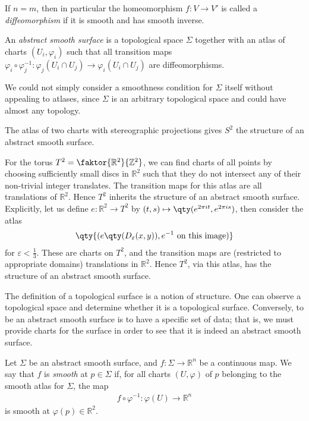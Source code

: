 If $n = m$, then in particular the homeomorphism $f \colon V \to V'$ is called a \textit{diffeomorphism} if it is smooth and has smooth inverse.
\begin{definition}
	An \textit{abstract smooth surface} is a topological space $\Sigma$ together with an atlas of charts $(U_i, \varphi_i)$ such that all transition maps $\varphi_i \circ \varphi_j^{-1} \colon \varphi_j(U_i \cap U_j) \to \varphi_i(U_i \cap U_j)$ are diffeomorphisms.
\end{definition}
\begin{remark}
	We could not simply consider a smoothness condition for $\Sigma$ itself without appealing to atlases, since $\Sigma$ is an arbitrary topological space and could have almost any topology.
\end{remark}
\begin{example}
	The atlas of two charts with stereographic projections gives $S^2$ the structure of an abstract smooth surface.
\end{example}
\begin{example}
	For the torus $T^2 = \faktor{\mathbb R^2}{\mathbb Z^2}$, we can find charts of all points by choosing sufficiently small discs in $\mathbb R^2$ such that they do not intersect any of their non-trivial integer translates.
	The transition maps for this atlas are all translations of $\mathbb R^2$.
	Hence $T^2$ inherits the structure of an abstract smooth surface.
	Explicitly, let us define $e \colon \mathbb R^2 \to T^2$ by $(t,s) \mapsto \qty(e^{2\pi i t}, e^{2 \pi i s})$, then consider the atlas
	\begin{align*}
		\qty{(e\qty(D_\varepsilon(x,y)), e^{-1} \text{ on this image})}
	\end{align*}
	for $\varepsilon < \frac{1}{3}$.
	These are charts on $T^2$, and the transition maps are (restricted to appropriate domains) translations in $\mathbb R^2$.
	Hence $T^2$, via this atlas, has the structure of an abstract smooth surface.
\end{example}
\begin{remark}
	The definition of a topological surface is a notion of structure.
	One can observe a topological space and determine whether it is a topological surface.
	Conversely, to be an abstract smooth surface is to have a specific set of data; that is, we must provide charts for the surface in order to see that it is indeed an abstract smooth surface.
\end{remark}
\begin{definition}
	Let $\Sigma$ be an abstract smooth surface, and $f \colon \Sigma \to \mathbb R^n$ be a continuous map.
	We say that $f$ is \textit{smooth} at $p \in \Sigma$ if, for all charts $(U, \varphi)$ of $p$ belonging to the smooth atlas for $\Sigma$, the map
	\begin{align*}
		f \circ \varphi^{-1} \colon \varphi(U) \to \mathbb R^n
	\end{align*}
	is smooth at $\varphi(p) \in \mathbb R^2$.
\end{definition}
